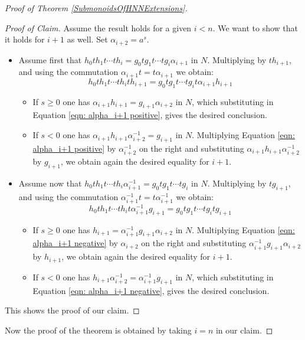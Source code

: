 \documentclass{amsart}
\theoremstyle{plain}
\theoremstyle{definition}
\begin{document}
\begin{proof}[Proof of Theorem \ref{SubmonoidsOfHNNExtensions}]
\begin{proof}[Proof of Claim]
Assume the result holds for a given $i < n$. We want to show that it holds for $i + 1$ as well. Set $\alpha_{i+2} = a^s$. 
\begin{itemize}[partopsep=0pt]
\item[(1)] Assume first that $h_0 t h_1 t \cdots t h_i = g_0 t g_1 t \cdots t g_i \alpha_{i+1}$ in $N$. Multiplying by $th_{i + 1}$, and using the commutation $\alpha_{i+1} t = t \alpha_{i+1}$ we obtain:
\begin{equation}\label{eqn: alpha_i+1 positive}
h_0 t h_1 t \cdots t h_i th_{i + 1} = g_0 t g_1 t \cdots t g_i t \alpha_{i+1} h_{i + 1}
\end{equation}
\begin{itemize}[partopsep=0pt]
\item[(a)] If $s \geq 0$ one has 
$\alpha_{i+1} h_{i+1} = g_{i+1} \alpha_{i+2}$ in $N$, which substituting in Equation \eqref{eqn: alpha_i+1 positive}, gives the desired conclusion.
\item[(b)] If $s < 0$ one has 
$\alpha_{i+1} h_{i+1}\alpha_{i+2}^{-1} = g_{i+1}$ in $N$. Multiplying Equation \eqref{eqn: alpha_i+1 positive} by $\alpha_{i+2}^{-1}$ on the right and substituting $\alpha_{i+1} h_{i+1}\alpha_{i+2}^{-1}$ by $g_{i+1}$, we obtain again the desired equality for $i+1$.
\end{itemize}
\item[(2)] Assume now that $h_0 t h_1 t \cdots t h_i \alpha_{i+1}^{-1} = g_0 t g_1 t \cdots t g_i$ in $N$. Multiplying by $tg_{i + 1}$, and using the commutation $\alpha_{i+1}^{-1} t = t \alpha_{i+1}^{-1}$ we obtain:
\begin{equation}\label{eqn: alpha_i+1 negative}
h_0 t h_1 t \cdots t h_i t \alpha_{i+1}^{-1} g_{i + 1} = g_0 t g_1 t \cdots t g_i t g_{i + 1}
\end{equation}
\begin{itemize}[partopsep=0pt]
\item[(a)] If $s \geq 0$ one has 
$h_{i+1} = \alpha_{i+1}^{-1} g_{i+1} \alpha_{i+2}$ in $N$. Multiplying Equation \eqref{eqn: alpha_i+1 negative} by $\alpha_{i+2}$ on the right and substituting $\alpha_{i+1}^{-1} g_{i+1} \alpha_{i+2}$ by $h_{i+1}$, we obtain again the desired equality for $i+1$.
\item[(b)] If $s < 0$ one has 
$h_{i+1}\alpha_{i+2}^{-1} = \alpha_{i+1}^{-1} g_{i+1}$ in $N$,  which substituting in Equation \eqref{eqn: alpha_i+1 negative}, gives the desired conclusion.
\end{itemize}
\end{itemize}
This shows the proof of our claim.
\end{proof}
Now the proof of the theorem is obtained by taking $i = n$ in our claim.
\end{proof}
\end{document}
